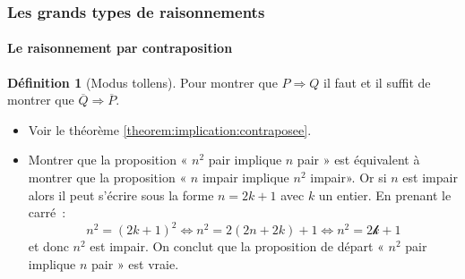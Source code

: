 \documentclass[10pt,notheorems]{beamer}
\theoremstyle{plain}
\theoremstyle{definition} %
\newtheorem{definition}{Définition}
\begin{document}
\begin{frame}
  \frametitle{Les grands types de raisonnements}
  \framesubtitle{Le raisonnement par contraposition}
  \hypertarget{slide_raisonnement_par_contraposition}{}

  \begin{definition}[Modus tollens]
    Pour montrer que $P\Rightarrow Q$ il faut et il suffit de montrer que $\overline Q\Rightarrow \overline P$.
  \end{definition}

  \begin{itemize}

    \bigskip

  \item Voir le théorème \hyperlink{slide_reciproque_et_contraposee}{\ref{theorem:implication:contraposee}}.\newline

  \item Montrer que la proposition « $n^2$ pair implique $n$ pair » est équivalent à montrer que la proposition « $n$ impair implique $n^2$ impair». Or si $n$ est impair alors il peut s'écrire sous la forme $n = 2k+1$ avec $k$ un entier. En prenant le carré~:
    \[
      n^2 = (2k+1)^2 \Leftrightarrow n^2 = 2(2n+2k) + 1 \Leftrightarrow n^2 = 2\mathcal{k} + 1
    \]
    et donc $n^2$ est impair. On conclut que la proposition de départ « $n^2$ pair implique $n$ pair » est vraie.

  \end{itemize}

\end{frame}


\end{document}
